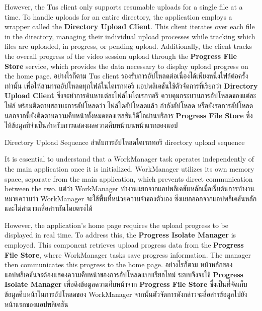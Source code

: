 \ifenglish
However, the Tus client only supports resumable uploads for a single file at a time. To handle uploads for an entire directory, the application employs a wrapper called the \textbf{Directory Upload Client}. This client iterates over each file in the directory, managing their individual upload processes while tracking which files are uploaded, in progress, or pending upload. Additionally, the client tracks the overall progress of the video session upload through the \textbf{Progress File Store} service, which provides the data necessary to display upload progress on the home page.
\else
อย่างไรก็ตาม Tus client รองรับการอัปโหลดต่อเนื่องได้เพียงหนึ่งไฟล์ต่อครั้งเท่านั้น เพื่อให้สามารถอัปโหลดทุกไฟล์ในไดเรกทอรี แอปพลิเคชันใช้ตัวจัดการที่เรียกว่า \textbf{Directory Upload Client} ซึ่งจะทำการค้นหาแต่ละไฟล์ในไดเรกทอรี ควบคุมกระบวนการอัปโหลดของแต่ละไฟล์ พร้อมติดตามสถานะการอัปโหลดว่า ไฟล์ใดอัปโหลดแล้ว กำลังอัปโหลด หรือยังรอการอัปโหลด นอกจากนี้ยังติดตามความคืบหน้าทั้งหมดของเซสชันวิดีโอผ่านบริการ \textbf{Progress File Store} ซึ่งให้ข้อมูลที่จำเป็นสำหรับการแสดงผลความคืบหน้าบนหน้าแรกของแอป
\fi

{\ifenglish Directory Upload Sequence \else ลำดับการอัปโหลดไดเรกทอรี \fi}
{directory upload sequence}

\ifenglish
It is essential to understand that a WorkManager task operates independently of the main application once it is initialized. WorkManager utilizes its own memory space, separate from the main application, which prevents direct communication between the two.
\else
แต่ว่า WorkManager ทำงานแยกจากแอปพลิเคชันหลักเมื่อเริ่มต้นการทำงาน หมายความว่า WorkManager จะใช้พื้นที่หน่วยความจำของตัวเอง ซึ่งแยกออกจากแอปพลิเคชันหลัก และไม่สามารถสื่อสารกันโดยตรงได้
\fi

\ifenglish
However, the application's home page requires the upload progress to be displayed in real time. To address this, the \textbf{Progress Isolate Manager} is employed. This component retrieves upload progress data from the \textbf{Progress File Store}, where WorkManager tasks save progress information. The manager then communicates this progress to the home page.
\else
อย่างไรก็ตาม หน้าหลักของแอปพลิเคชันจะต้องแสดงความคืบหน้าของการอัปโหลดแบบเรียลไทม์ ระบบจึงจะใช้ \textbf{Progress Isolate Manager} เพื่อดึงข้อมูลความคืบหน้าจาก \textbf{Progress File Store} ซึ่งเป็นที่จัดเก็บข้อมูลคืบหน้าในการอัปโหลดของ WorkManager จากนั้นตัวจัดการดังกล่าวจะสื่อสารข้อมูลไปยังหน้าแรกของแอปพลิเคชัน
\fi


